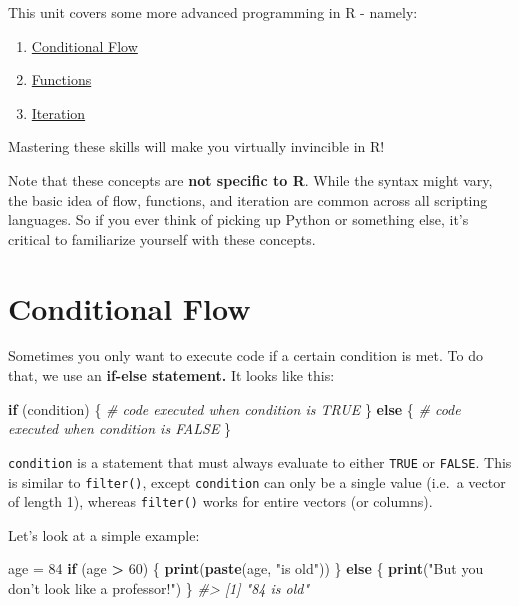 \documentclass[]{book}
\newenvironment{Shaded}{\begin{snugshade}}{\end{snugshade}}
\newcommand{\CommentTok}[1]{\textcolor[rgb]{0.56,0.35,0.01}{\textit{#1}}}
\newcommand{\ControlFlowTok}[1]{\textcolor[rgb]{0.13,0.29,0.53}{\textbf{#1}}}
\newcommand{\DecValTok}[1]{\textcolor[rgb]{0.00,0.00,0.81}{#1}}
\newcommand{\KeywordTok}[1]{\textcolor[rgb]{0.13,0.29,0.53}{\textbf{#1}}}
\newcommand{\NormalTok}[1]{#1}
\newcommand{\OperatorTok}[1]{\textcolor[rgb]{0.81,0.36,0.00}{\textbf{#1}}}
\newcommand{\StringTok}[1]{\textcolor[rgb]{0.31,0.60,0.02}{#1}}
\providecommand{\tightlist}{%
  \setlength{\itemsep}{0pt}\setlength{\parskip}{0pt}}
\begin{document}
This unit covers some more advanced programming in R - namely:

\begin{enumerate}
\def\labelenumi{\arabic{enumi}.}
\tightlist
\item
  \protect\hyperlink{conditional-flow}{Conditional Flow}
\item
  \protect\hyperlink{functions-1}{Functions}
\item
  \protect\hyperlink{iteration}{Iteration}
\end{enumerate}

Mastering these skills will make you virtually invincible in R!

Note that these concepts are \textbf{not specific to R}. While the syntax might vary, the basic idea of flow, functions, and iteration are common across all scripting languages. So if you ever think of picking up Python or something else, it's critical to familiarize yourself with these concepts.

\hypertarget{conditional-flow}{%
\section{Conditional Flow}\label{conditional-flow}}

Sometimes you only want to execute code if a certain condition is met. To do that, we use an \textbf{if-else statement.} It looks like this:

\begin{Shaded}
\begin{Highlighting}[]
\ControlFlowTok{if}\NormalTok{ (condition) \{}
  \CommentTok{# code executed when condition is TRUE}
\NormalTok{\} }\ControlFlowTok{else}\NormalTok{ \{}
  \CommentTok{# code executed when condition is FALSE}
\NormalTok{\}}
\end{Highlighting}
\end{Shaded}

\texttt{condition} is a statement that must always evaluate to either \texttt{TRUE} or \texttt{FALSE}. This is similar to \texttt{filter()}, except \texttt{condition} can only be a single value (i.e.~a vector of length 1), whereas \texttt{filter()} works for entire vectors (or columns).

Let's look at a simple example:

\begin{Shaded}
\begin{Highlighting}[]
\NormalTok{age =}\StringTok{ }\DecValTok{84}
\ControlFlowTok{if}\NormalTok{ (age }\OperatorTok{>}\StringTok{ }\DecValTok{60}\NormalTok{) \{}
    \KeywordTok{print}\NormalTok{(}\KeywordTok{paste}\NormalTok{(age, }\StringTok{"is old"}\NormalTok{))}
\NormalTok{\} }\ControlFlowTok{else}\NormalTok{ \{}
    \KeywordTok{print}\NormalTok{(}\StringTok{"But you don't look like a professor!"}\NormalTok{)}
\NormalTok{\}}
\CommentTok{#> [1] "84 is old"}
\end{Highlighting}
\end{Shaded}
\end{document}
